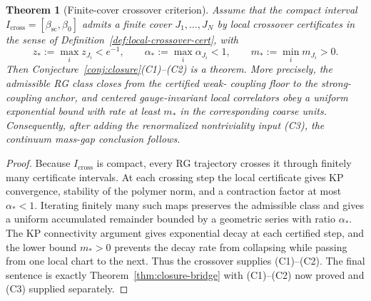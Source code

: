\documentclass[11pt]{article}
\newtheorem{theorem}{Theorem}[section]
\theoremstyle{definition}
\newcommand{\betasc}{\beta_{\mathrm{sc}}}
\begin{document}
\begin{theorem}[Finite-cover crossover criterion]
\label{thm:finite-cover-crossover}
Assume that the compact interval
$I_{\mathrm{cross}}=[\betasc,\beta_0]$ admits a finite cover
$J_1,\ldots,J_N$ by local crossover certificates in the sense of
Definition~\ref{def:local-crossover-cert}, with
\[
z_*:=\max_i z_{J_i}<e^{-1},
\qquad
\alpha_*:=\max_i\alpha_{J_i}<1,
\qquad
m_*:=\min_i m_{J_i}>0.
\]
Then Conjecture~\ref{conj:closure}(C1)--(C2) is a theorem.  More
precisely, the admissible RG class closes from the certified weak-
coupling floor to the strong-coupling anchor, and centered
gauge-invariant local correlators obey a uniform exponential bound with
rate at least $m_*$ in the corresponding coarse units.
Consequently, after adding the renormalized nontriviality input
(C3), the continuum mass-gap conclusion follows.
\end{theorem}

\begin{proof}
Because $I_{\mathrm{cross}}$ is compact, every RG trajectory crosses it
through finitely many certificate intervals.  At each crossing step the
local certificate gives KP convergence, stability of the polymer norm,
and a contraction factor at most $\alpha_*<1$.  Iterating finitely many
such maps preserves the admissible class and gives a uniform accumulated
remainder bounded by a geometric series with ratio $\alpha_*$.  The KP
connectivity argument gives exponential decay at each certified step,
and the lower bound $m_*>0$ prevents the decay rate from collapsing while
passing from one local chart to the next.  Thus the crossover supplies
(C1)--(C2).  The final sentence is exactly Theorem~\ref{thm:closure-bridge}
with (C1)--(C2) now proved and (C3) supplied separately.
\end{proof}
\end{document}
